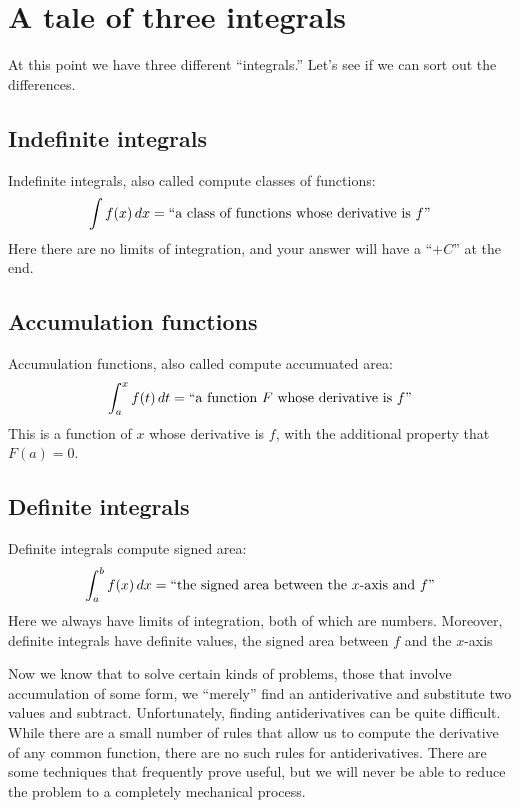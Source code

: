 \documentclass{ximera}
\begin{document}
\section{A tale of three integrals}

At this point we have three different ``integrals.'' Let's see if we
can sort out the differences.

\subsection{Indefinite integrals}

Indefinite integrals, also called  compute
classes of functions:
\[
\int f(x) \,d x = \text{``a class of functions whose derivative is $f$''}
\]
Here there are no limits of integration, and your answer will have a
``$+C$'' at the end.

\subsection{Accumulation functions}

Accumulation functions, also called  compute accumuated area:
\[
\int_a^x f(t) \,d t = \text{``a function $F$ whose derivative is $f$''}
\]
This is a function of $x$ whose derivative is $f$, with the additional
property that $F(a)=0$.


\subsection{Definite integrals}

Definite integrals compute signed area:
\[
\int_a^b f(x) \,d x = \text{``the signed area between the $x$-axis and $f$''}
\]
Here we always have limits of integration, both of which are
numbers. Moreover, definite integrals have definite values, the signed
area between $f$ and the $x$-axis


Now we know that to solve certain kinds of problems, those that
involve accumulation of some form, we ``merely'' find an
antiderivative and substitute two values and subtract. Unfortunately,
finding antiderivatives can be quite difficult. While there are a
small number of rules that allow us to compute the derivative of any
common function, there are no such rules for antiderivatives. There
are some techniques that frequently prove useful, but we will never be
able to reduce the problem to a completely mechanical process.
\end{document}
